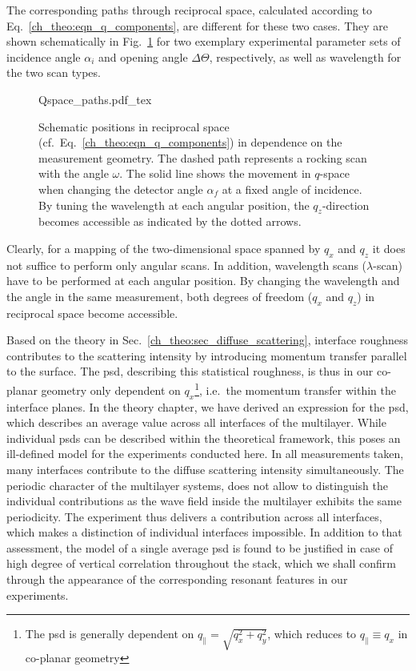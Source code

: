 The corresponding paths through reciprocal space, calculated according to Eq.~\eqref{ch_theo:eqn_q_components}, are different for these two cases. They are shown schematically in Fig.~\ref{ch_diff:fig_pathsInQ} for two exemplary experimental parameter sets of incidence angle $\alpha_i$ and opening angle $\Delta \Theta$, respectively,  as well as wavelength for the two scan types.
\begin{figure}[htbp]
    \def\svgwidth{0.7\textwidth}
    {Qspace_paths.pdf_tex}
    \caption{Schematic positions in reciprocal space (cf.~Eq.~\eqref{ch_theo:eqn_q_components}) in dependence on the measurement geometry. The dashed path represents a rocking scan with the angle $\omega$. The solid line shows the movement in $q$-space when changing the detector angle $\alpha_f$ at a fixed angle of incidence. By tuning the wavelength at each angular position, the $q_z$-direction becomes accessible as indicated by the dotted arrows.}
    \label{ch_diff:fig_pathsInQ} 
\end{figure}
Clearly, for a mapping of the two-dimensional space spanned by $q_x$ and $q_z$ it does not suffice to perform only angular scans. In addition, wavelength scans ($\lambda$-scan) have to be performed at each angular position. By changing the wavelength and the angle in the same measurement, both degrees of freedom ($q_x$ and $q_z$) in reciprocal space become accessible.

Based on the theory in Sec.~\ref{ch_theo:sec_diffuse_scattering}, interface roughness contributes to the scattering intensity by introducing momentum transfer parallel to the surface. The \gls{psd}, describing this statistical roughness, is thus in our co-planar geometry only dependent on $q_x$\footnote{The \gls{psd} is generally dependent on $q_\parallel = \sqrt{q_x^2+q_y^2}$, which reduces to $q_\parallel \equiv q_x$ in co-planar geometry}, i.e.~the momentum transfer within the interface planes. In the theory chapter, we have derived an expression for the \gls{psd}, which describes an average value across all interfaces of the multilayer. While individual \gls{psd}s can be described within the theoretical framework, this poses an ill-defined model for the experiments conducted here. In all measurements taken, many interfaces contribute to the diffuse scattering intensity simultaneously. The periodic character of the multilayer systems, does not allow to distinguish the individual contributions as the wave field inside the multilayer exhibits the same periodicity. The experiment thus delivers a contribution across all interfaces, which makes a distinction of individual interfaces impossible. In addition to that assessment, the model of a single average \gls{psd} is found to be justified in case of high degree of vertical correlation throughout the stack, which we shall confirm through the appearance of the corresponding resonant features in our experiments.


